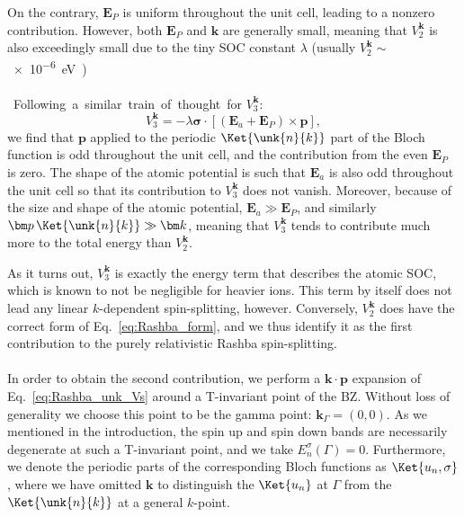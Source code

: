 On the contrary, $\bm E_P$ is uniform throughout the unit cell, leading to a nonzero contribution.
However, both $\bm E_P$ and $\bm k$ are generally small, meaning that $V^{\bm k}_2$ is also exceedingly small due to the tiny SOC constant $\lambda$ (usually $V^{\bm k}_2 \sim$ \SI{e-6}eV).
\\\\
Following a similar train of thought for $V^{\bm k}_3$:
\begin{equation}
	V^{\bm k}_3 = -\lambda \bm{\sigma} \cdot \left[ (\bm E_a + \bm E_P) \times \bm{p}\right],
\end{equation}
we find that $\bm p$ applied to the periodic $\Ket{\unk{n}{k}}$ part of the Bloch function is odd throughout the unit cell, and the contribution from the even $\bm E_P$ is zero.
The shape of the atomic potential is such that $\bm E_a$ is also odd throughout the unit cell so that its contribution to $V^{\bm k}_3$ does not vanish.
Moreover, because of the size and shape of the atomic potential, $\bm E_a \gg \bm E_P$, and similarly $\bm p\,\Ket{\unk{n}{k}} \gg \bm k$, meaning that $V^{\bm k}_3$ tends to contribute much more to the total energy than $V^{\bm k}_2$.

As it turns out, $V^{\bm k}_3$ is exactly the energy term that describes the atomic SOC, which is known to not be negligible for heavier ions.
This term by itself does not lead any linear $k$-dependent spin-splitting, however.
Conversely, $V_2^{\bm k}$ does have the correct form of Eq.~\eqref{eq:Rashba_form}, and we thus identify it as the first contribution to the purely relativistic Rashba spin-splitting.
\\\\
In order to obtain the second contribution, we perform a $\bm k \cdot \bm p$ expansion of Eq.~\eqref{eq:Rashba_unk_Vs} around a T-invariant point of the BZ.
Without loss of generality we choose this point to be the gamma point: $\bm{k}_\Gamma = (0, 0)$.
As we mentioned in the introduction, the spin up and spin down bands are necessarily degenerate at such a T-invariant point, and we take $E^{\sigma}_n(\Gamma) = 0$.
Furthermore, we denote the periodic parts of the corresponding Bloch functions as $\Ket{u_n, \sigma}$, where we have omitted $\bm k$ to distinguish the $\Ket{u_n}$ at $\Gamma$ from the $\Ket{\unk{n}{k}}$ at a general $k$-point.

